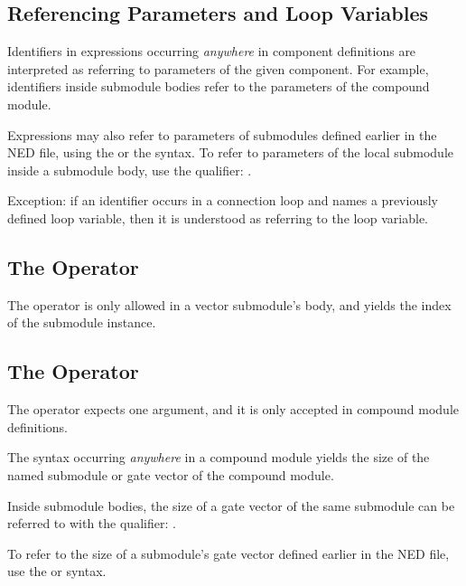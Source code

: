 {\subsection{Referencing Parameters and Loop Variables}
\label{sec:ned-ref:referencing-parameters-and-loop-variables}

Identifiers in expressions occurring \textit{anywhere} in component definitions
are interpreted as referring to parameters of the given component. For example,
identifiers inside submodule bodies refer to the parameters of the compound
module.

Expressions may also refer to parameters of submodules defined earlier
in the NED file, using the  or the
 syntax. To refer to parameters
of the local submodule inside a submodule body, use the
 qualifier: .

Exception: if an identifier occurs in a connection  loop and names
a previously defined loop variable, then it is understood as referring to
the loop variable.


\subsection{The  Operator}
\label{sec:ned-ref:index-operator}

The  operator is only allowed in a vector submodule's body,
and yields the index of the submodule instance.


\subsection{The  Operator}
\label{sec:ned-ref:sizeof-operator}

The  operator expects one argument, and it is only accepted
in compound module definitions.

The  syntax occurring \textit{anywhere} in a compound
module yields the size of the named submodule or gate vector of the
compound module.

Inside submodule bodies, the size of a gate vector of the same submodule
can be referred to with the  qualifier: .

To refer to the size of a submodule's gate vector defined earlier in the
NED file, use the  or
 syntax.


}

